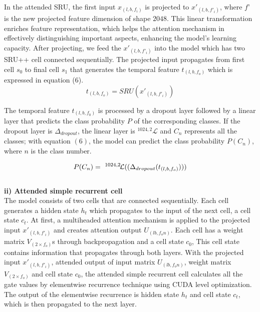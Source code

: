 \documentclass[runningheads]{llncs}
\begin{document}
In the attended SRU, the first input $x_{(l,b,f_i)}$ is projected to $x'_{(l,b,f'_i)}$, where $f’$ is the new projected feature dimension of shape $2048$. This linear transformation enriches feature representation, which helps the attention mechanism in effectively distinguishing important aspects, enhancing the model’s learning capacity. After projecting, we feed the $x'_{(l,b,f'_i)}$ into the model which has two SRU++ cell connected sequentially. The projected input propagates from first cell $s_0$ to final cell $s_1$ that generates the temporal feature $t_{(l,b,f_o)}$ which is expressed in equation ($6$).
\begin{equation}
t_{(l,b,f_o)} = SRU(x'_{(l,b,f'_i)})
\end{equation}

The temporal feature $t_{(l,b,f_0)}$ is processed by a dropout layer followed by a linear layer that predicts the class probability $P$ of the corresponding classes. If the dropout layer is $\Delta_{dropout}$, the linear layer is $^{1024, 2}\!\mathcal{L}$ and $C_n$ represents all the classes; with equation $(6)$, the model can predict the class probability $P(C_n)$, where $n$ is the class number.

\begin{equation}
P(C_n) = \ ^{1024, 2}\!\mathcal{L}((\Delta_{dropout}(t_{(l,b,f_o)})))\\
\end{equation}\\

\vspace{-5mm}
\noindent
\textbf{ii) Attended simple recurrent cell}\\

The model consists of two cells that are connected sequentially. Each cell generates a hidden state $h_t$ which propagates to the input of the next cell, a cell state $c_t$. At first, a multiheaded attention mechanism is applied to the projected input  $x'_{(l,b,f'_i)}$ and creates attention output $U_{(lb, f_on)}$. Each cell has a weight matrix $V_{(2\times f_o)}$s through backpropagation and a cell state $c_0$, This cell state contains information that propagates through both layers. With the projected input $x'_{(l,b,f'_i)}$, attended output of input matrix $U_{(lb, f_on)}$, weight matrix  $V_{(2\times f_o)}$ and cell state $c_0$, the attended simple recurrent cell calculates all the gate values by elementwise recurrence technique using CUDA level optimization. The output of the elementwise recurrence is hidden state $h_t$ and cell state $c_t$, which is then propagated to the next layer. \\
\end{document}
